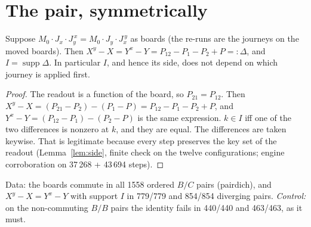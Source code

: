 \documentclass[11pt]{article}
\theoremstyle{definition}\newtheorem{definition}[theorem]{Definition}\newtheorem{remark}[theorem]{Remark}
\begin{document}
\section{The pair, symmetrically}\label{sec:pair}
\begin{lemma}\label{lem:mixed}
Suppose $M_0\cdot J_x\cdot J_y^{\,x}=M_0\cdot J_y\cdot J_x^{\,y}$ as boards (the re-runs are the journeys on the moved boards). Then $X^y-X=Y^x-Y=P_{12}-P_1-P_2+P=:\Delta$, and $I=\operatorname{supp}\Delta$. In particular $I$, and hence its side, does not depend on which journey is applied first.
\end{lemma}
\begin{proof}
The readout is a function of the board, so $P_{21}=P_{12}$. Then $X^y-X=(P_{21}-P_2)-(P_1-P)=P_{12}-P_1-P_2+P$, and $Y^x-Y=(P_{12}-P_1)-(P_2-P)$ is the same expression. $k\in I$ iff one of the two differences is nonzero at $k$, and they are equal. The differences are taken keywise. That is legitimate because every step preserves the key set of the readout (Lemma~\ref{lem:side}, finite check on the twelve configurations; engine corroboration on 37\,268 + 43\,694 steps).
\end{proof}
\noindent Data: the boards commute in all 1558 ordered $B/C$ pairs (pairdich), and $X^y-X=Y^x-Y$ with support $I$ in 779/779 and 854/854 diverging pairs. \emph{Control:} on the non-commuting $B/B$ pairs the identity fails in 440/440 and 463/463, as it must.
\end{document}
